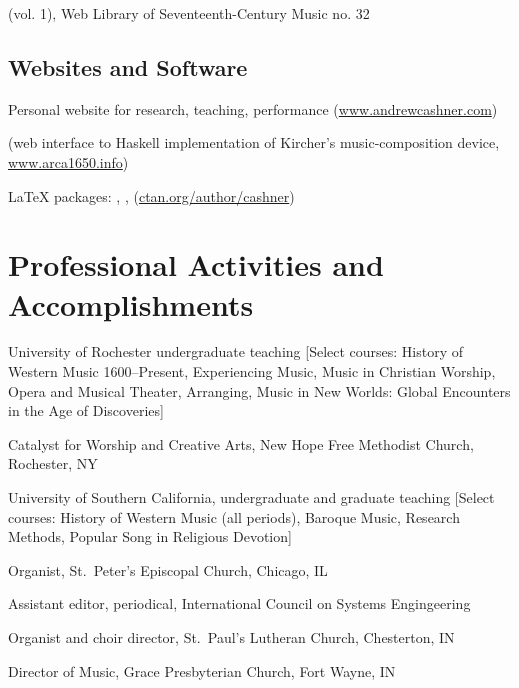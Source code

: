 \documentclass{neh-resume}
\begin{document}
{
(vol. 1), Web Library of Seventeenth-Century Music no. 32}

\subsection{Websites and Software}

{Personal website for research, teaching, performance (\url{www.andrewcashner.com})}

{ (web interface to Haskell implementation of Kircher's
music-composition device, \url{www.arca1650.info})}

{\LaTeX{} packages: , ,
 (\url{ctan.org/author/cashner})}

\section{Professional Activities and Accomplishments}
{University of Rochester undergraduate teaching}
[Select courses: 
History of Western Music 1600--Present, 
Experiencing Music, 
Music in Christian Worship, 
Opera and Musical Theater, 
Arranging, 
Music in New Worlds: Global Encounters in the Age of Discoveries]

{Catalyst for Worship and Creative Arts,
New Hope Free Methodist Church, Rochester, NY}

{University of Southern California, undergraduate and graduate teaching}
[Select courses:
History of Western  Music (all periods), Baroque Music, Research Methods,
Popular Song in Religious Devotion]

{Organist, St.\ Peter's Episcopal Church, Chicago, IL}

{Assistant editor,  periodical, International Council on
Systems Engingeering}
    
{Organist and choir director, St.\ Paul's Lutheran Church, Chesterton, IN}
    
{Director of Music, Grace Presbyterian Church, Fort Wayne, IN}
\end{document}
